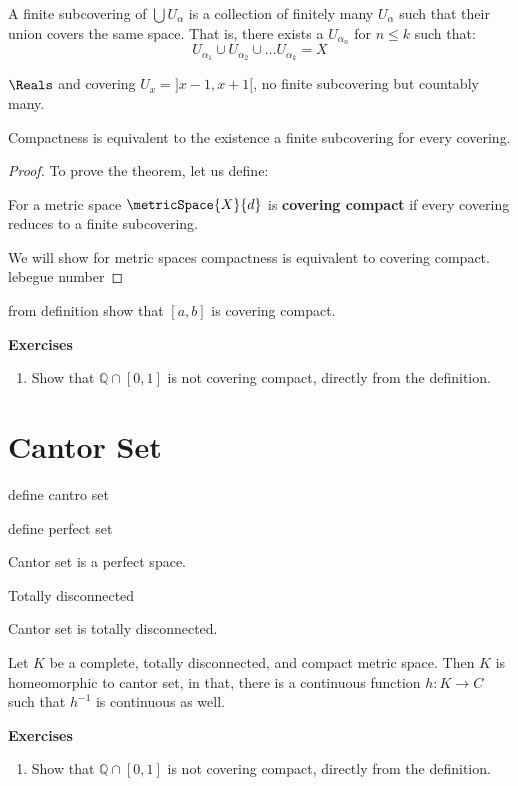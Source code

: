 \begin{definition}
    A finite subcovering of \(\bigcup U_\alpha\) is a collection of finitely many \(U_\alpha\) such that their union covers the same space. That is, there exists a \(U_{\alpha_n}\) for \(n \leq k\) such that:
    \[U_{\alpha_1} \cup U_{\alpha_2} \cup \dots U_{\alpha_k} = X\]
\end{definition}
\begin{example}
    \(\Reals\) and covering \(U_x = ]x-1,x+1[\), no finite subcovering but countably many.
\end{example}
\begin{theorem}
    Compactness is equivalent to the existence a finite subcovering for every covering.
\end{theorem}
\begin{proof}
    To prove the theorem, let us define:
    \begin{definition}
        For a metric space \(\metricSpace{X}{d}\) is \textbf{covering compact} if every covering reduces to a finite subcovering.
    \end{definition}
    We will show for metric spaces compactness is equivalent to covering compact.
    lebegue number
\end{proof}
\begin{example}
    from definition show that \([a,b]\) is covering compact.
\end{example}

{\Large\textbf{Exercises}}
\begin{enumerate}
    \item Show that \(\mathbb{Q} \cap [0,1]\) is not covering compact, directly from the definition.
\end{enumerate}
\newpage


\section{Cantor Set}
\begin{definition}
    define cantro set
\end{definition}
\begin{definition}
    define perfect set
\end{definition}
\begin{proposition}
    Cantor set is a perfect space.
\end{proposition}
\begin{definition}
    Totally disconnected
\end{definition}
\begin{proposition}
    Cantor set is totally disconnected.
\end{proposition}
\begin{theorem}
    Let \(K\) be a complete, totally disconnected, and compact metric space. Then \(K\) is homeomorphic to cantor set, in that, there is a continuous function \(h : K \to C\) such that \(h^{-1}\) is continuous as well.
\end{theorem}
{\Large\textbf{Exercises}}
\begin{enumerate}
    \item Show that \(\mathbb{Q} \cap [0,1]\) is not covering compact, directly from the definition.
\end{enumerate}
